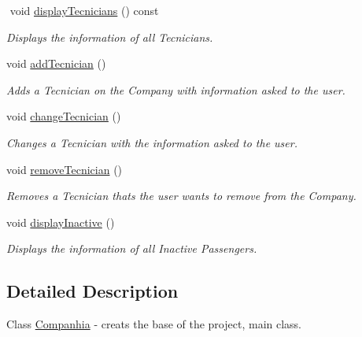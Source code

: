 \begin{DoxyCompactItemize}
$$\mbox{\label{class_companhia_a01f4b9605cc35b3b0a8e12dda0e6f571}} 
void \hyperlink{class_companhia_a01f4b9605cc35b3b0a8e12dda0e6f571}{display\+Tecnicians} () const
\begin{DoxyCompactList}\small\item\em Displays the information of all Tecnicians. \end{DoxyCompactList}\item 
\mbox{\label{class_companhia_a4c4f93dab1c710ca129e8363005b8b8c}} 
void \hyperlink{class_companhia_a4c4f93dab1c710ca129e8363005b8b8c}{add\+Tecnician} ()
\begin{DoxyCompactList}\small\item\em Adds a Tecnician on the Company with information asked to the user. \end{DoxyCompactList}\item 
\mbox{\label{class_companhia_a6edff0c18066401ea6432c647d5c4a5e}} 
void \hyperlink{class_companhia_a6edff0c18066401ea6432c647d5c4a5e}{change\+Tecnician} ()
\begin{DoxyCompactList}\small\item\em Changes a Tecnician with the information asked to the user. \end{DoxyCompactList}\item 
\mbox{\label{class_companhia_a9082231067bacc30a52893cdf3feb2f8}} 
void \hyperlink{class_companhia_a9082231067bacc30a52893cdf3feb2f8}{remove\+Tecnician} ()
\begin{DoxyCompactList}\small\item\em Removes a Tecnician thats the user wants to remove from the Company. \end{DoxyCompactList}\item 
\mbox{\label{class_companhia_adfe87f0da13fe3b145757ceb54b0f054}} 
void \hyperlink{class_companhia_adfe87f0da13fe3b145757ceb54b0f054}{display\+Inactive} ()
\begin{DoxyCompactList}\small\item\em Displays the information of all Inactive Passengers. \end{DoxyCompactList}\end{DoxyCompactItemize}


\subsection{Detailed Description}
Class \hyperlink{class_companhia}{Companhia} -\/ creats the base of the project, main class. 

